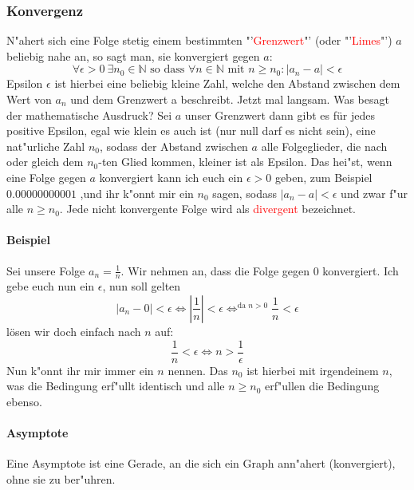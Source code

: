 \subsubsection{Konvergenz}
N"ahert sich eine Folge stetig einem bestimmten "'\textcolor{red}{Grenzwert}"' (oder "'\textcolor{red}{Limes}"') $a$ beliebig nahe an, so sagt man, sie konvergiert gegen $a$:
\begin{equation*}
\forall \epsilon > 0 \ \exists n_0  \in \mathbb{N} \text{ so dass } \forall n \in \mathbb{N} \text{ mit } n \geq n_0 : |a_n - a|< \epsilon
\end{equation*}
Epsilon $\epsilon$ ist hierbei eine beliebig kleine Zahl, welche den Abstand zwischen dem Wert von $a_n$ und dem Grenzwert a beschreibt. Jetzt mal langsam. Was besagt der mathematische Ausdruck? Sei $a$ unser Grenzwert dann gibt es für jedes positive Epsilon, egal wie klein es auch ist (nur null darf es nicht sein), eine nat"urliche Zahl $n_0$, sodass der Abstand zwischen $a$ alle Folgeglieder, die nach oder gleich dem $n_0$-ten Glied kommen, kleiner ist als Epsilon. Das hei"st, wenn eine Folge gegen $a$ konvergiert kann ich euch ein $\epsilon > 0$ geben, zum Beispiel $0.00000000001$ ,und ihr k"onnt mir ein $n_0$ sagen, sodass $|a_n - a| < \epsilon$ und zwar f"ur alle $n \geq n_0$. Jede nicht konvergente Folge wird als \textcolor{red}{divergent} bezeichnet.

\paragraph{Beispiel}
Sei unsere Folge $a_n = \frac{1}{n}$. Wir nehmen an, dass die Folge gegen $0$ konvergiert. Ich gebe euch nun ein $\epsilon$, nun soll gelten 
\begin{equation*}
|a_n - 0| < \epsilon \iff \left|\frac{1}{n}\right| < \epsilon \iff^{\text{da } n > 0} \frac{1}{n} < \epsilon
\end{equation*}
lösen wir doch einfach nach $n$ auf:
\begin{equation*}
\frac{1}{n} < \epsilon \iff n > \frac{1}{\epsilon}
\end{equation*}
Nun k"onnt ihr mir immer ein $n$ nennen. Das $n_0$ ist hierbei mit irgendeinem $n$, was die Bedingung erf"ullt identisch und alle $n \geq n_0$ erf"ullen die Bedingung ebenso.

\paragraph{Asymptote}
Eine Asymptote ist eine Gerade, an die sich ein Graph ann"ahert (konvergiert), ohne sie zu ber"uhren.

